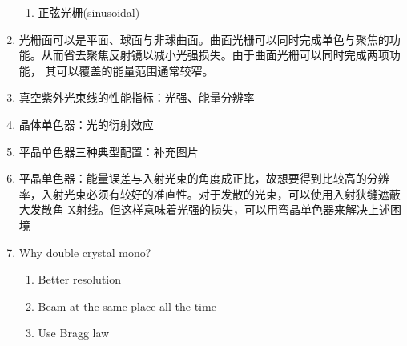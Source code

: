 \documentclass[12pt,a4paper]{article}
\begin{document}
\begin{enumerate}
\begin{enumerate}
                    \item 正弦光栅(sinusoidal)
                \end{enumerate}
            \item 光栅面可以是平面、球面与非球曲面。曲面光栅可以同时完成单色与聚焦的功能。从而省去聚焦反射镜以减小光强损失。由于曲面光栅可以同时完成两项功能，
                其可以覆盖的能量范围通常较窄。
            \item 真空紫外光束线的性能指标：光强、能量分辨率
            \item 晶体单色器：光的衍射效应
            \item 平晶单色器三种典型配置：补充图片
            \item 平晶单色器：能量误差与入射光束的角度成正比，故想要得到比较高的分辨率，入射光束必须有较好的准直性。对于发散的光束，可以使用入射狭缝遮蔽大发散角
                X射线。但这样意味着光强的损失，可以用弯晶单色器来解决上述困境
            \item Why double crystal mono?
                \begin{enumerate}
                    \item Better resolution
                    \item Beam at the same place all the time
                    \item Use Bragg law
                \end{enumerate}
    \end{enumerate}
\end{document}
